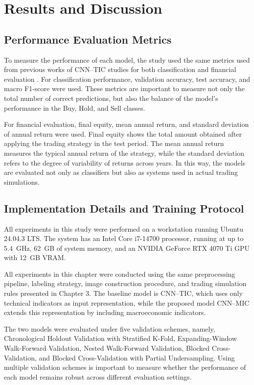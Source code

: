 \chapter{Results and Discussion}
\label{chap:results}

\section{Performance Evaluation Metrics}

To measure the performance of each model, the study used the same metrics used from previous works of CNN--TIC studies for both classification and financial evaluation \cite{maratkhan2021deep}. For classification performance, validation accuracy, test accuracy, and macro F1-score were used. These metrics are important to measure not only the total number of correct predictions, but also the balance of the model's performance in the Buy, Hold, and Sell classes.

For financial evaluation, final equity, mean annual return, and standard deviation of annual return were used. Final equity shows the total amount obtained after applying the trading strategy in the test period. The mean annual return measures the typical annual return of the strategy, while the standard deviation refers to the degree of variability of returns across years. In this way, the models are evaluated not only as classifiers but also as systems used in actual trading simulations.

\section{Implementation Details and Training Protocol}
All experiments in this study were performed on a workstation running Ubuntu 24.04.3 LTS. The system has an Intel Core i7-14700 processor, running at up to 5.4~GHz, 62~GB of system memory, and an NVIDIA GeForce RTX 4070 Ti GPU with 12~GB VRAM. 


All experiments in this chapter were conducted using the same preprocessing pipeline, labeling strategy, image construction procedure, and trading simulation rules presented in Chapter 3. The baseline model is CNN--TIC, which uses only technical indicators as input representation, while the proposed model CNN--MIC extends this representation by including macroeconomic indicators.

The two models were evaluated under five validation schemes, namely, Chronological Holdout Validation with Stratified K-Fold, Expanding-Window Walk-Forward Validation, Nested Walk-Forward Validation, Blocked Cross-Validation, and Blocked Cross-Validation with Partial Undersampling. Using multiple validation schemes is important to measure whether the performance of each model remains robust across different evaluation settings.

